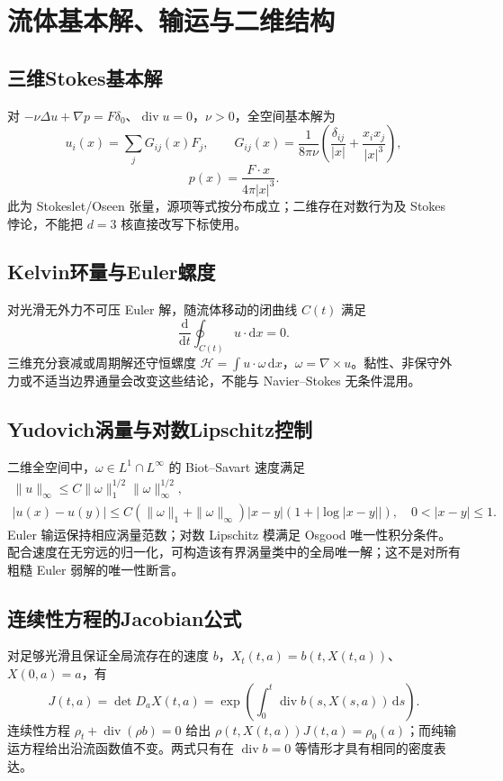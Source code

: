 \documentclass[../main.tex]{subfiles}
\begin{document}
\section{流体基本解、输运与二维结构}
\subsection{三维Stokes基本解}
对 $-\nu\Delta u+\nabla p=F\delta_0$、$\operatorname{div}u=0$，$\nu>0$，全空间基本解为
\[
u_i(x)=\sum_jG_{ij}(x)F_j,\qquad
G_{ij}(x)=\frac1{8\pi\nu}\left(\frac{\delta_{ij}}{|x|}+\frac{x_ix_j}{|x|^3}\right),
\]
\[
p(x)=\frac{F\cdot x}{4\pi|x|^3}.
\]
此为 Stokeslet/Oseen 张量，源项等式按分布成立；二维存在对数行为及 Stokes 悖论，不能把 $d=3$ 核直接改写下标使用。
\subsection{Kelvin环量与Euler螺度}
对光滑无外力不可压 Euler 解，随流体移动的闭曲线 $C(t)$ 满足
\[
\frac{\mathrm d}{\mathrm dt}\oint_{C(t)}u\cdot\mathrm dx=0.
\]
三维充分衰减或周期解还守恒螺度 $\mathcal H=\int u\cdot\omega\,\mathrm dx$，$\omega=\nabla\times u$。黏性、非保守外力或不适当边界通量会改变这些结论，不能与 Navier--Stokes 无条件混用。
\subsection{Yudovich涡量与对数Lipschitz控制}
二维全空间中，$\omega\in L^1\cap L^\infty$ 的 Biot--Savart 速度满足
\begin{gather*}
\|u\|_\infty\le C\|\omega\|_1^{1/2}\|\omega\|_\infty^{1/2},\\
|u(x)-u(y)|\le C(\|\omega\|_1+\|\omega\|_\infty)
|x-y|(1+|\log|x-y||),\quad0<|x-y|\le1.
\end{gather*}
Euler 输运保持相应涡量范数；对数 Lipschitz 模满足 Osgood 唯一性积分条件。配合速度在无穷远的归一化，可构造该有界涡量类中的全局唯一解；这不是对所有粗糙 Euler 弱解的唯一性断言。
\subsection{连续性方程的Jacobian公式}
对足够光滑且保证全局流存在的速度 $b$，$X_t(t,a)=b(t,X(t,a))$、$X(0,a)=a$，有
\[
J(t,a)=\det D_aX(t,a)
=\exp\left(\int_0^t\operatorname{div}b(s,X(s,a))\,\mathrm ds\right).
\]
连续性方程 $\rho_t+\operatorname{div}(\rho b)=0$ 给出 $\rho(t,X(t,a))J(t,a)=\rho_0(a)$；而纯输运方程给出沿流函数值不变。两式只有在 $\operatorname{div}b=0$ 等情形才具有相同的密度表达。
\end{document}
